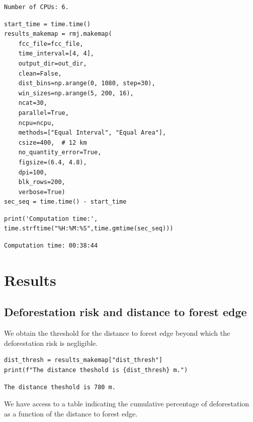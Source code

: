 \documentclass[paper=a4, 12pt, DIV=12]{scrartcl}
\begin{document}
\begin{verbatim}
Number of CPUs: 6.
\end{verbatim}


\begin{verbatim}
start_time = time.time()
results_makemap = rmj.makemap(
    fcc_file=fcc_file,
    time_interval=[4, 4],
    output_dir=out_dir,
    clean=False,
    dist_bins=np.arange(0, 1080, step=30),
    win_sizes=np.arange(5, 200, 16),
    ncat=30,
    parallel=True,
    ncpu=ncpu,
    methods=["Equal Interval", "Equal Area"],
    csize=400,  # 12 km
    no_quantity_error=True,
    figsize=(6.4, 4.8),
    dpi=100,
    blk_rows=200,
    verbose=True)
sec_seq = time.time() - start_time
\end{verbatim}

\begin{verbatim}
print('Computation time:', time.strftime("%H:%M:%S",time.gmtime(sec_seq)))
\end{verbatim}

\begin{verbatim}
Computation time: 00:38:44
\end{verbatim}

\section{Results}
\label{sec:orge2b702b}

\subsection{Deforestation risk and distance to forest edge}
\label{sec:orga463fb6}

We obtain the threshold for the distance to forest edge beyond which the deforestation risk is negligible.

\begin{verbatim}
dist_thresh = results_makemap["dist_thresh"]
print(f"The distance theshold is {dist_thresh} m.")
\end{verbatim}

\begin{verbatim}
The distance theshold is 780 m.
\end{verbatim}


We have access to a table indicating the cumulative percentage of deforestation as a function of the distance to forest edge.
\end{document}
